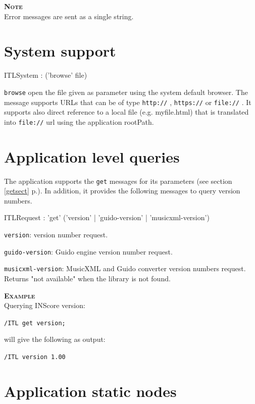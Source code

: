 \documentclass[a4paper,twoside]{report}
\newcommand{\sublevel}[1]	{\section{#1}}
\newcommand{\fullref}[1]	{\ref{#1} p.\pageref{#1}}
\newcommand{\OSC}[1]		{\texttt{#1}}
\newcommand{\example}		{\textbf{\hspace{-1.5cm}\textbf{\textsc{Example }}}}
\newcommand{\note}	[1]		{\vspace{2mm}\textbf{\hspace{-0.9cm}\textbf{\textsc{Note #1}}}}
\let\olditemize\itemize
\let\oldenditemize\enditemize
\renewenvironment{itemize} 	{\olditemize \setlength{\itemsep}{1mm}}{\oldenditemize}
\newcommand{\sample}	[1]			{\vspace{-2mm}\begin{center}\colorbox{mygrey}{
								\begin{minipage}[t]{0.9\columnwidth} 
								{\small \texttt{#1}}
								\end{minipage}}\end{center}}
\newcommand{\sampleindent}	{ \hspace{0.5cm} }
\begin{document}
\note{} \\
Error messages are sent as a single string.

\sublevel{System support}
\label{system}

\begin{rail}
ITLSystem : ('browse' file)
\end{rail}

\begin{itemize}
\item \OSC{browse} open the file given as parameter using the system default browser. The message supports URLs that can be of type \OSC{http://} , \OSC{https://} or \OSC{file://} . It supports also direct reference to a local file (e.g. myfile.html) that is translated into \OSC{file://} url using the application rootPath.
\end{itemize}



\sublevel{Application level queries}
\label{ITLQuery}

The application supports the \OSC{get} messages for its parameters (see section \fullref{getsect}). In addition, it provides the following messages to query version numbers.

\begin{rail}
ITLRequest : 'get'  ('version' | 'guido-version' | 'musicxml-version')
\end{rail}

\begin{itemize}
\item \OSC{version}: version number request.
\item \OSC{guido-version}: Guido engine version number request.
\item \OSC{musicxml-version}: MusicXML and Guido converter version numbers request. Returns "not available" when the library is not found.

\end{itemize}

\example \\
Querying INScore version:
\sample{/ITL get version;}
\sampleindent will give the following as output:
\sample{/ITL version 1.00}

\sublevel{Application static nodes}
\label{ITLStatic}
\end{document}
